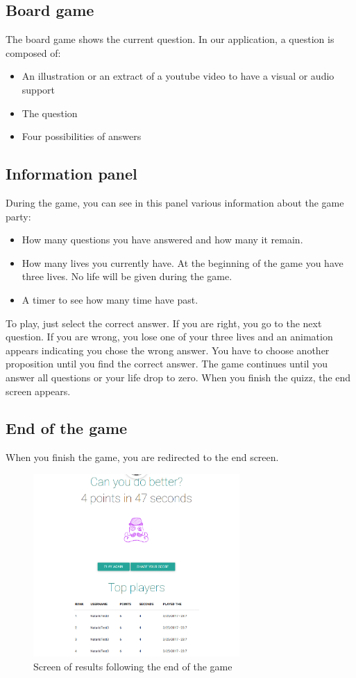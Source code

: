 \documentclass[a4paper,11pt, oneside]{book}
\begin{document}
\subsection{Board game}
The board game shows the current question. In our application, a question is composed of:
\begin{itemize}
	\item An illustration or an extract of a youtube video to have a visual or audio support
	\item The question
	\item Four possibilities of answers
\end{itemize}

\subsection{Information panel}
	During the game, you can see in this panel various information about the game party:
	\begin{itemize}
	\item How many questions you have answered and how many it remain.
	\item How many lives you currently have. At the beginning of the game you have three lives. No life will be given during the game.
	\item A timer to see how many time have past.
	\end{itemize}

To play, just select the correct answer.
If you are right, you go to the next question.
If you are wrong, you lose one of your three lives and an animation appears indicating you chose the wrong answer. You have to choose another proposition until you find the correct answer.
The game continues until you answer all questions or your life drop to zero.
When you finish the quizz, the end screen appears.

\subsection{End of the game}
When you finish the game, you are redirected to the end screen.
\begin{figure} [htbp]
	\centering
	\includegraphics[width=0.7\textwidth]{CEnd.png}
	\caption{Screen of results following the end of the game}
\end{figure}
\end{document}
